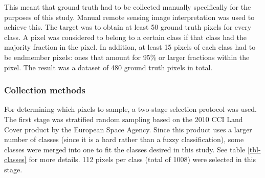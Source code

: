 \documentclass[a4paper,10pt]{book}
\begin{document}
This meant that ground truth had to be collected manually specifically for the purposes of this study. Manual remote sensing image interpretation \citep{defries1998training} was used to achieve this. The target was to obtain at least 50 ground truth pixels for every class. A pixel was considered to belong to a certain class if that class had the majority fraction in the pixel. In addition, at least 15 pixels of each class had to be endmember pixels: ones that amount for 95\% or larger fractions within the pixel. The result was a dataset of 480 ground truth pixels in total.

\subsubsection{Collection methods}

For determining which pixels to sample, a two-stage selection protocol was used. The first stage was stratified random sampling based on the 2010 CCI Land Cover product by the European Space Agency. Since this product uses a larger number of classes (since it is a hard rather than a fuzzy classification), some classes were merged into one to fit the classes desired in this study. See table \ref{tbl-classes} for more details. 112 pixels per class (total of 1008) were selected in this stage.
\end{document}
